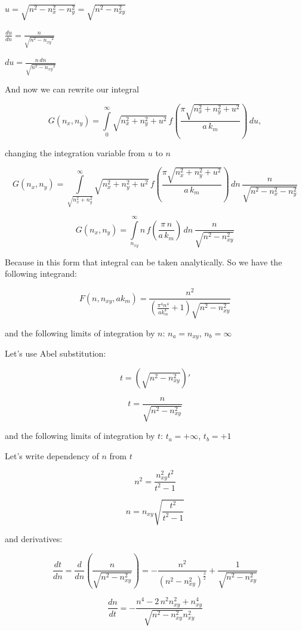 \documentclass[11pt]{article}
\begin{document}
\(u = \sqrt{n^2 - n_x^2 - n_y^2} = \sqrt{n^2 - n_{xy}^2}\)

\(\frac{du}{dn} = \frac{n}{\sqrt{n^{2} - \mathit{n_{xy}}^{2}}}\)

\(d{u}= \frac{n\,d{n}}{\sqrt{n^{2} - \mathit{n_{xy}}^{2}}}\)

    And now we can rewrite our integral

    \[G\left(n_x, n_y\right) = \int\limits_{0}^{\infty}\sqrt{n_x^2 + n_y^2+u^2}\,
f\left(\frac{\pi\sqrt{n_x^2 + n_y^2+u^2}}{a\,k_m}\right)\,d{u}, 
\]

changing the integration variable from \(u\) to \(n\)

    \[
G\left(n_x, n_y\right) = \int\limits_{\sqrt{n_x^2 + n_y^2}}^{\infty}\sqrt{n_x^2 + n_y^2+u^2}\,
f\left(\frac{\pi\sqrt{n_x^2 + n_y^2+u^2}}{a\,k_m}\right)\,dn\,{\frac{n}{\sqrt{n^{2} - n_{x}^{2} - n_{y}^{2}}}}
\]

    \[
G\left(n_x, n_y\right) = \int\limits_{n_{xy}}^{\infty}n\,
f\left(\frac{\pi\,n}{a\,k_m}\right)\,dn\,{\frac{n}{\sqrt{n^{2} - n_{xy}^{2}}}}
\]

    Because in this form that integral can be taken analytically. So we have
the following integrand:

    \[F\left(n, n_{xy}, ak_m\right) = \frac{n^{2}}{{\left(\frac{\pi^{4} n^{4}}{\mathit{ak}_{m}^{4}} + 1\right)} \sqrt{n^{2} - n_{\mathit{xy}}^{2}}}\]

    and the following limits of integration by \(n\): \(n_a = n_{xy}\),
\(n_b = \infty\)

    Let's use Abel substitution:

\[t = \left(\sqrt{n^2-n_{xy}^2}\right)'\]

    \[t = \frac{n}{\sqrt{n^{2} - n_{\mathit{xy}}^{2}}}\]

    and the following limits of integration by \(t\): \(t_a = +\infty\),
\(t_b = +1\)

    Let's write dependency of \(n\) from \(t\)

    \[n^{2} = \frac{n_{\mathit{xy}}^{2} t^{2}}{t^{2} - 1}\]

    \[n = n_{\mathit{xy}} \sqrt{\frac{t^{2}}{t^{2} - 1}}\]

    and derivatives:

    \[\frac{dt}{dn} = \frac{d}{dn} \left( \frac{n}{\sqrt{n^{2} - n_{\mathit{xy}}^{2}}} \right)= -\frac{n^{2}}{{\left(n^{2} - n_{\mathit{xy}}^{2}\right)}^{\frac{3}{2}}} + \frac{1}{\sqrt{n^{2} - n_{\mathit{xy}}^{2}}}\]

    \[\frac{dn}{dt} = -\frac{n^{4} - 2 \, n^{2} n_{\mathit{xy}}^{2} + n_{\mathit{xy}}^{4}}{\sqrt{n^{2} - n_{\mathit{xy}}^{2}} n_{\mathit{xy}}^{2}}\]
\end{document}
